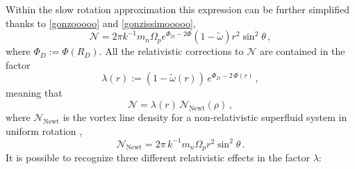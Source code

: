 \documentclass[usenatbib%
]{mnras}
\newcommand{\spc}{\quad \quad \quad}
\begin{document}
%
Within the slow rotation approximation this expression can be further simplified thanks to \eqref{gonzooooo} and \eqref{gonzissimooooo}, 
\begin{equation}\label{buzzlight}
\mathcal{N} = 2\pi k^{-1} m_n \Omega_p e^{\Phi_D - 2\Phi} (1 - \tilde{\omega}) r^2 \sin^2 \theta \, ,
\end{equation}
where $\Phi_D := \Phi (R_D)$. All the  relativistic corrections to $\mathcal{N}$ are contained  in the factor
\begin{equation}\label{lambdinopiccolo}
\lambda (r) :=  \left( 1-\tilde{\omega}(r) \right) \, e^{\Phi_D - 2\, \Phi(r)} \, ,
\end{equation}
meaning that
\begin{equation}\label{strangethings}
\mathcal{N} = \lambda (r) \, \mathcal{N}_{\textrm{Newt}} (\rho) \, ,
\end{equation}
where $\mathcal{N}_{\textrm{Newt}}$ is the vortex line density  for a non-relativistic superfluid system in uniform rotation \citep{FEYNMAN1955},
\begin{equation}
\mathcal{N}_{\textrm{Newt}} =  2\pi \, k^{-1} m_n \Omega_p r^2 \sin^2 \theta \, .
\end{equation}
It is possible to recognize  three different relativistic effects in the factor $\lambda$:
\end{document}

